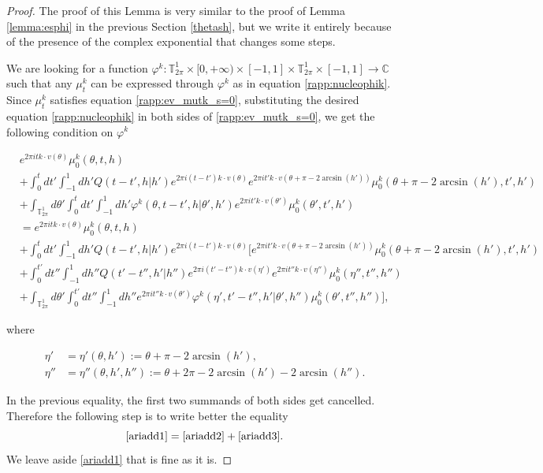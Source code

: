 \documentclass[a4paper,10pt,reqno]{amsart}
\numberwithin{equation}{subsection}
\numberwithin{figure}{subsection}
\begin{document}
\begin{proof} The proof of this Lemma is very similar to the proof of Lemma \ref{lemma:esphi} in the previous Section \ref{thetash}, but we write it entirely because of the presence of the complex exponential that changes some steps.

We are looking for a function $\varphi^k:\mathbb{T}^1_{2\pi}\times[0,+\infty)\times[-1,1]\times\mathbb{T}^1_{2\pi}\times[-1,1]\to\mathbb{C}$ such that any $\mu_t^k$ can be expressed through $\varphi^k$ as in equation \eqref{rapp:nucleophik}. Since $\mu_t^k$ satisfies equation \eqref{rapp:ev_mutk_s=0}, substituting the desired equation \eqref{rapp:nucleophik} in both sides of \eqref{rapp:ev_mutk_s=0}, we get the following condition on $\varphi^k$

{\scriptsize\begin{align}
\nonumber&e^{2\pi itk\cdot v(\theta)}\mu_0^k(\theta,t,h)
\\
\nonumber&+\int_0^tdt'\int_{-1}^1dh'Q(t-t',h|h')e^{2\pi i(t-t')k\cdot v(\theta)}e^{2\pi it' k\cdot v(\theta+\pi-2\arcsin(h'))}\mu_0^k(\theta+\pi-2\arcsin(h'),t',h')
\\
\label{ariadd1}&+\int_{\mathbb{T}^1_{2\pi}}d\theta'\int_0^tdt'\int_{-1}^1dh'\varphi^k(\theta,t-t',h|\theta',h')e^{2\pi it' k\cdot v(\theta')}\mu_0^k(\theta',t',h')
\\
\nonumber&=e^{2\pi itk\cdot v(\theta)}\mu_0^k(\theta,t,h)
\\
\nonumber&+\int_0^tdt'\int_{-1}^1dh'Q(t-t',h|h')e^{2\pi i(t-t')k\cdot v(\theta)}\biggl[e^{2\pi it' k\cdot v(\theta+\pi-2\arcsin(h'))}\mu_0^k(\theta+\pi-2\arcsin(h'),t',h')
\\
\label{ariadd2}&+\int_0^{t'}dt''\int_{-1}^1dh''Q(t'-t'',h'|h'')e^{2\pi i(t'-t'')k\cdot v(\eta')} e^{2\pi i t''k\cdot v(\eta'')}\mu_0^k(\eta'',t'',h'')
\\
\label{ariadd3}&+\int_{\mathbb{T}^1_{2\pi}}d\theta'\int_0^{t'}dt''\int_{-1}^1dh'' e^{2\pi it''k\cdot v(\theta')}\varphi^k(\eta',t'-t'',h'|\theta',h'')\mu_0^k(\theta',t'',h'')\biggr],
\end{align}}

where 

\begin{align}
\nonumber\eta'&=\eta'(\theta,h'):=\theta+\pi-2\arcsin(h'),
\\
\label{notacazzo}\eta''&=\eta''(\theta,h',h''):=\theta+2\pi-2\arcsin(h')-2\arcsin(h'').
\end{align}

In the previous equality, the first two summands of both sides get cancelled. Therefore the following step is to write better the equality
\[
\eqref{ariadd1}=\eqref{ariadd2}+\eqref{ariadd3}.
\]
We leave aside \eqref{ariadd1} that is fine as it is.


\end{proof}
\end{document}
